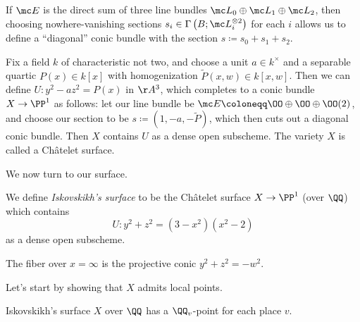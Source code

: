 \documentclass[../notes.tex]{subfiles}
\begin{document}
\begin{example}
	If $\mc E$ is the direct sum of three line bundles $\mc L_0\oplus\mc L_1\oplus\mc L_2$, then choosing nowhere-vanishing sections $s_i\in\Gamma\left(B;\mc L_i^{\otimes2}\right)$ for each $i$ allows us to define a ``diagonal'' conic bundle with the section $s\coloneqq s_0+s_1+s_2$.
\end{example}
\begin{example} \label{ex:chat}
	Fix a field $k$ of characteristic not two, and choose a unit $a\in k^\times$ and a separable quartic $P(x)\in k[x]$ with homogenization $\widetilde P(x,w)\in k[x,w]$. Then we can define $U\colon y^2-az^2=P(x)$ in $\AA^3$, which completes to a conic bundle $X\to\PP^1$ as follows: let our line bundle be $\mc E\coloneqq\OO\oplus\OO\oplus\OO(2)$, and choose our section to be $s\coloneqq(1,-a,-\widetilde P)$, which then cuts out a diagonal conic bundle. Then $X$ contains $U$ as a dense open subscheme. The variety $X$ is called a Ch\^atelet surface.
\end{example}
We now turn to our surface.
\begin{definition}
	We define \textit{Iskovskikh's surface} to be the Ch\^atelet surface $X\to\PP^1$ (over $\QQ$) which contains
	\[U\colon y^2+z^2=\left(3-x^2\right)\left(x^2-2\right)\]
	as a dense open subscheme.
\end{definition}
\begin{remark} \label{rem:isok-infinity}
	The fiber over $x=\infty$ is the projective conic $y^2+z^2=-w^2$.
\end{remark}
Let's start by showing that $X$ admits local points.
\begin{proposition} \label{prop:isok-hasse}
	Iskovskikh's surface $X$ over $\QQ$ has a $\QQ_v$-point for each place $v$.
\end{proposition}
\end{document}

